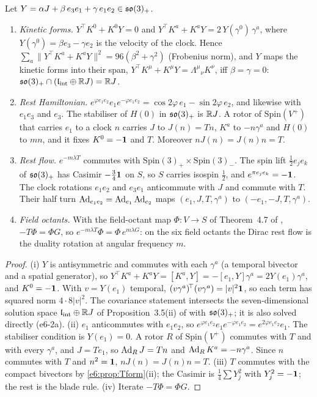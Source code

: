 \begin{proposition}
\label{e6:prop:dirac}
Let $Y=\alpha J+\beta\,e_3e_1+\gamma\,e_1e_2\in\mathfrak{so}(3)_+$.
\begin{enumerate}[label=(\roman*),leftmargin=2.2em]
\item \emph{Kinetic forms.} $Y^{\!\top}K^0+K^0Y=0$ and $Y^{\!\top}K^a+K^aY=2\,Y(\gamma^0)\,\gamma^a$, where $Y(\gamma^0)=\beta e_3-\gamma e_2$ is the velocity
of the clock. Hence $\sum_a\|Y^{\!\top}K^a+K^aY\|^2=96(\beta^2+\gamma^2)$ (Frobenius norm), and $Y$ maps the kinetic forms into their span,
$Y^{\!\top}K^\mu+K^\mu Y=\Lambda^\mu{}_\nu K^\nu$, iff $\beta=\gamma=0$: $\mathfrak{so}(3)_+\cap(\mathfrak l_{\rm int}\oplus\mathbb{R} J)=\mathbb{R} J$.
\item \emph{Rest Hamiltonian.} $e^{\varphi e_1e_2}e_1e^{-\varphi e_1e_2}=\cos2\varphi\,e_1-\sin2\varphi\,e_2$, and likewise with $e_1e_3$ and $e_3$. The stabiliser of
$H(0)$ in $\mathfrak{so}(3)_+$ is $\mathbb{R} J$. A rotor of $\mathrm{Spin}(V^+)$ that carries $e_1$ to a clock $n$ carries $J$ to $J(n)=Tn$, $K^a$ to $-n\gamma^a$ and
$H(0)$ to $mn$, and it fixes $K^0=-\mathbf 1$ and $T$. Moreover $nJ(n)=J(n)n=T$.
\item \emph{Rest flow.} $e^{-m\lambda T}$ commutes with $\mathrm{Spin}(3)_+\times\mathrm{Spin}(3)_-$. The spin lift $\tfrac12e_je_k$ of $\mathfrak{so}(3)_+$ has Casimir
$-\tfrac34\mathbf 1$ on $S$, so $S$ carries isospin $\tfrac12$, and $e^{\pi e_je_k}=-\mathbf 1$. The clock rotations $e_1e_2$ and $e_3e_1$ anticommute with $J$ and commute
with $T$. Their half turn $\operatorname{Ad}_{e_1e_2}=\operatorname{Ad}_{e_1}\operatorname{Ad}_{e_2}$ maps $(e_1,J,T,\gamma^a)$ to $(-e_1,-J,T,\gamma^a)$.
\item \emph{Field octants.} With the field-octant map $\Phi\colon V\to S$ of Theorem~4.7 of \cite{TR}, $-T\Phi=\Phi G$, so
$e^{-m\lambda T}\Phi=\Phi\,e^{m\lambda G}$: on the six field octants the Dirac rest flow is the duality rotation at angular frequency $m$.
\end{enumerate}
\end{proposition}

\begin{proof}
(i) $Y$ is antisymmetric and commutes with each $\gamma^a$ (a temporal bivector and a spatial generator), so
$Y^{\!\top}K^a+K^aY=[K^a,Y]=-[e_1,Y]\gamma^a=2Y(e_1)\gamma^a$, and $K^0=-\mathbf 1$. With $v=Y(e_1)$ temporal, $(v\gamma^a)^{\!\top}(v\gamma^a)=|v|^2\mathbf 1$, so each term has
squared norm $4\cdot8|v|^2$. The covariance statement intersects the seven-dimensional solution space $\mathfrak l_{\rm int}\oplus\mathbb{R} J$ of Proposition~3.5(ii) of
\cite{RE} with $\mathfrak{so}(3)_+$; it is also solved directly (e6-2a). (ii) $e_1$ anticommutes with $e_1e_2$, so $e^{\varphi e_1e_2}e_1e^{-\varphi e_1e_2}=e^{2\varphi e_1e_2}e_1$. The
stabiliser condition is $Y(e_1)=0$. A rotor $R$ of $\mathrm{Spin}(V^+)$ commutes with $T$ and with every $\gamma^a$, and $J=Te_1$, so $\operatorname{Ad}_RJ=Tn$ and
$\operatorname{Ad}_RK^a=-n\gamma^a$. Since $n$ commutes with $T$ and $n^2=\mathbf 1$, $nJ(n)=J(n)n=T$. (iii) $T$ commutes with the compact bivectors by
\cref{e6:prop:Tform}(ii); the Casimir is $\tfrac14\sum Y_j^2$ with $Y_j^2=-\mathbf 1$; the rest is the blade rule. (iv) Iterate $-T\Phi=\Phi G$.
\end{proof}

